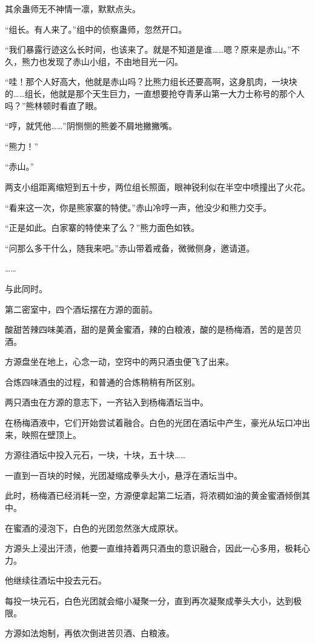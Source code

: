 \begin{this_body}
其余蛊师无不神情一凛，默默点头。

“组长。有人来了。”组中的侦察蛊师，忽然开口。

“我们暴露行迹这么长时间，也该来了。就是不知道是谁……嗯？原来是赤山。”不久，熊力也发现了赤山小组，不由地目光一闪。

“哇！那个人好高大，他就是赤山吗？比熊力组长还要高啊，这身肌肉，一块块的……组长，他就是那个天生巨力，一直想要抢夺青茅山第一大力士称号的那个人吗？”熊林顿时看直了眼。

“哼，就凭他……”阴恻恻的熊姜不屑地撇撇嘴。

“熊力！”

“赤山。”

两支小组距离缩短到五十步，两位组长照面，眼神锐利似在半空中喷撞出了火花。

“看来这一次，你是熊家寨的特使。”赤山冷哼一声，他没少和熊力交手。

“正是如此。白家寨的特使来了么？”熊力面色如铁。

“问那么多干什么，随我来吧。”赤山带着戒备，微微侧身，邀请道。

……

与此同时。

第二密室中，四个酒坛摆在方源的面前。

酸甜苦辣四味美酒，甜的是黄金蜜酒，辣的白粮液，酸的是杨梅酒，苦的是苦贝酒。

方源盘坐在地上，心念一动，空窍中的两只酒虫便飞了出来。

合炼四味酒虫的过程，和普通的合炼稍稍有所区别。

两只酒虫在方源的意志下，一齐钻入到杨梅酒坛当中。

在杨梅酒液中，它们开始尝试着融合。白色的光团在酒坛中产生，豪光从坛口冲出来，映照在壁顶上。

方源往酒坛中投入元石，一块，十块，五十块……

一直到一百块的时候，光团凝缩成拳头大小，悬浮在酒坛当中。

此时，杨梅酒已经消耗一空，方源便拿起第二坛酒，将浓稠如油的黄金蜜酒倾倒其中。

在蜜酒的浸泡下，白色的光团忽然涨大成原状。

方源头上浸出汗渍，他要一直维持着两只酒虫的意识融合，因此一心多用，极耗心力。

他继续往酒坛中投去元石。

每投一块元石，白色光团就会缩小凝聚一分，直到再次凝聚成拳头大小，达到极限。

方源如法炮制，再依次倒进苦贝酒、白粮液。


\end{this_body}
